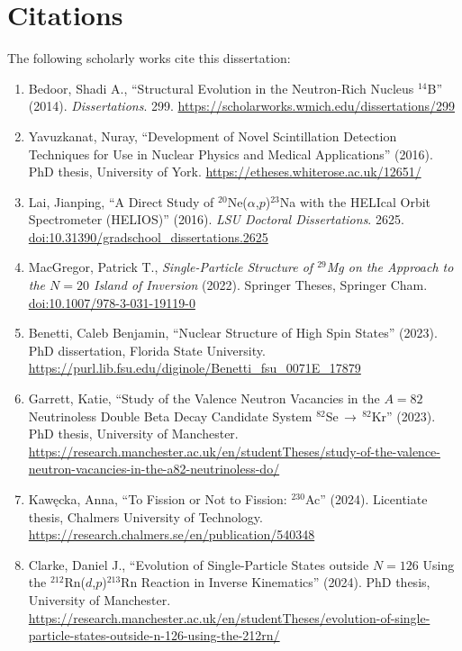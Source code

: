 \section{Citations}
The following scholarly works cite this dissertation:
\begin{enumerate}
    \item Bedoor, Shadi A., ``Structural Evolution in the Neutron-Rich Nucleus $^{14}$B'' (2014). \emph{Dissertations}. 299. \url{https://scholarworks.wmich.edu/dissertations/299} 

    \item Yavuzkanat, Nuray, ``Development of Novel Scintillation Detection Techniques for Use in Nuclear Physics and Medical Applications'' (2016). PhD thesis, University of York. \url{https://etheses.whiterose.ac.uk/12651/}

    \item Lai, Jianping, ``A Direct Study of $^{20}$Ne($\alpha$,$p$)$^{23}$Na with the HELIcal Orbit Spectrometer (HELIOS)'' (2016). \emph{LSU Doctoral Dissertations}. 2625. \href{https://doi.org/10.31390/gradschool_dissertations.2625}{doi:10.31390/gradschool\_dissertations.2625}
    
    \item MacGregor, Patrick T., \emph{Single-Particle Structure of $^{29}$Mg on the Approach to the $N=20$ Island of Inversion} (2022). Springer Theses, Springer Cham. \href{https://doi.org/10.1007/978-3-031-19119-0}{doi:10.1007/978-3-031-19119-0}
    
    \item Benetti, Caleb Benjamin, ``Nuclear Structure of High Spin States'' (2023). PhD dissertation, Florida State University. \url{https://purl.lib.fsu.edu/diginole/Benetti_fsu_0071E_17879} 
    
    \item Garrett, Katie, ``Study of the Valence Neutron Vacancies in the $A=82$ Neutrinoless Double Beta Decay Candidate System $^{82}$Se\,$\rightarrow$\,$^{82}$Kr'' (2023). PhD thesis, University of Manchester. \url{https://research.manchester.ac.uk/en/studentTheses/study-of-the-valence-neutron-vacancies-in-the-a82-neutrinoless-do/} %
        
    \item Kaw\k{e}cka, Anna, ``To Fission or Not to Fission: $^{230}$Ac'' (2024). Licentiate thesis, Chalmers University of Technology. \url{https://research.chalmers.se/en/publication/540348}
    
    \item Clarke, Daniel J., ``Evolution of Single-Particle States outside $N=126$ Using the $^{212}$Rn($d$,$p$)$^{213}$Rn Reaction in Inverse Kinematics'' (2024). PhD thesis, University of Manchester. \url{https://research.manchester.ac.uk/en/studentTheses/evolution-of-single-particle-states-outside-n-126-using-the-212rn/}    
\end{enumerate}